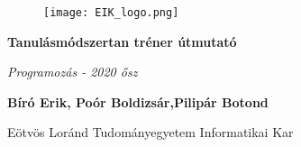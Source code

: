 \documentclass[../Main.tex]{subfiles}
\begin{document}
\begin{titlepage}
	
	\begin{figure}[t]
        \texttt{[image: EIK\_logo.png]}
    \end{figure}
	\begin{center}
		\vspace*{6\baselineskip}
	
		
		{\Huge \textbf{Tanulásmódszertan tréner útmutató\\}}
		
		\large{\textit{Programozás - 2020 ősz}}\\
		
        \vspace*{1,5\baselineskip}

        \begin{center}
        \large{\textbf{ Bíró Erik, Poór Boldizsár,Pilipár Botond}}\\
        \end{center}
		
		\vspace{1,5\baselineskip}
		
		
		\vspace{1,5\baselineskip}
		\large{Eötvös Loránd Tudományegyetem Informatikai Kar}\\

	\end{center}
	
    \vspace*{15\baselineskip}
	
\end{titlepage}
\end{document}
